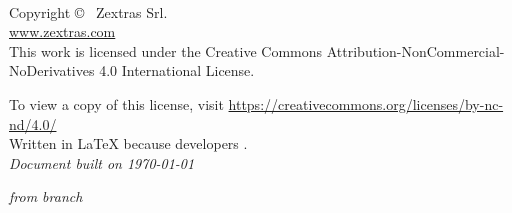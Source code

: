 
\newpage
~\vfill
\thispagestyle{empty}

Copyright \copyright\ \the\year{} Zextras Srl.\\ %

\url{www.zextras.com}\\ %

This work is licensed under the Creative Commons Attribution-NonCommercial-NoDerivatives 4.0 International License.

To view a copy of this license, visit \url{https://creativecommons.org/licenses/by-nc-nd/4.0/}\\

Written in \LaTeX{} because developers \ExcuseToUseLatex{}.\\

\textit{Document built on \today{}}

\textit{from branch \texttt{\branchName{}}} %
